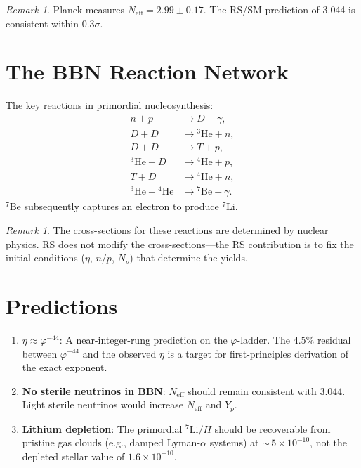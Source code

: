 \documentclass[12pt,a4paper]{article}
\theoremstyle{definition}
\theoremstyle{remark}
\newtheorem{remark}[theorem]{Remark}
\begin{document}
\begin{remark}
Planck measures $N_{\mathrm{eff}} = 2.99 \pm 0.17$.  The RS/SM
prediction of 3.044 is consistent within $0.3\sigma$.
\end{remark}

\section{The BBN Reaction Network}
\label{sec:network}

The key reactions in primordial nucleosynthesis:
\begin{align}
  n + p &\to D + \gamma, \label{eq:r1} \\
  D + D &\to {}^3\mathrm{He} + n, \label{eq:r2} \\
  D + D &\to T + p, \label{eq:r3} \\
  {}^3\mathrm{He} + D &\to {}^4\mathrm{He} + p, \label{eq:r4} \\
  T + D &\to {}^4\mathrm{He} + n, \label{eq:r5} \\
  {}^3\mathrm{He} + {}^4\mathrm{He} &\to {}^7\mathrm{Be} + \gamma.
  \label{eq:r6}
\end{align}
${}^7\mathrm{Be}$ subsequently captures an electron to produce
${}^7\mathrm{Li}$.

\begin{remark}
The cross-sections for these reactions are determined by nuclear
physics.  RS does not modify the cross-sections---the RS contribution
is to fix the initial conditions ($\eta$, $n/p$, $N_\nu$) that
determine the yields.
\end{remark}

\section{Predictions}
\label{sec:predictions}

\begin{enumerate}
  \item \textbf{$\eta \approx \varphi^{-44}$}: A near-integer-rung
  prediction on the $\varphi$-ladder.  The $4.5\%$ residual between
  $\varphi^{-44}$ and the observed $\eta$ is a target for
  first-principles derivation of the exact exponent.

  \item \textbf{No sterile neutrinos in BBN}: $N_{\mathrm{eff}}$
  should remain consistent with 3.044.  Light sterile neutrinos would
  increase $N_{\mathrm{eff}}$ and $Y_p$.

  \item \textbf{Lithium depletion}: The primordial
  ${}^7\mathrm{Li}/H$ should be recoverable from pristine gas clouds
  (e.g., damped Lyman-$\alpha$ systems) at
  ${\sim}\,5 \times 10^{-10}$, not the depleted stellar value
  of $1.6 \times 10^{-10}$.
\end{enumerate}
\end{document}
